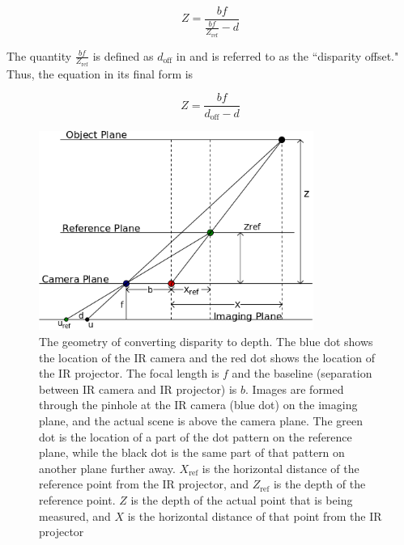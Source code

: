 \documentclass{article}
\begin{document}
\[ Z = \frac{bf}{ \frac{bf}{Z_{\text{ref}}} - d} \]

The quantity $\frac{bf}{Z_{\text{ref}}}$ is defined as $d_{\text{off}}$ in \cite{KonoligeCalibrationTechnical} and is referred to as the ``disparity offset."  Thus, the equation in its final form is

\[ Z = \frac{bf}{d_{\text{off}} - d} \]

\begin{figure}[h]
\centering
\includegraphics[width=0.8\textwidth]{DepthFromDisparity.png}
\caption{The geometry of converting disparity to depth.  The blue dot shows the location of the IR camera and the red dot shows the location of the IR projector.  The focal length is $f$ and the baseline (separation between IR camera and IR projector) is $b$.  Images are formed through the pinhole at the IR camera (blue dot) on the imaging plane, and the actual scene is above the camera plane.  The green dot is the location of a part of the dot pattern on the reference plane, while the black dot is the same part of that pattern on another plane further away.  $X_{\text{ref}}$ is the horizontal distance of the reference point from the IR projector, and $Z_{\text{ref}}$ is the depth of the reference point.  $Z$ is the depth of the actual point that is being measured, and $X$ is the horizontal distance of that point from the IR projector}
\label{fig:DepthFromDisparity}
\end{figure}





\end{document}
